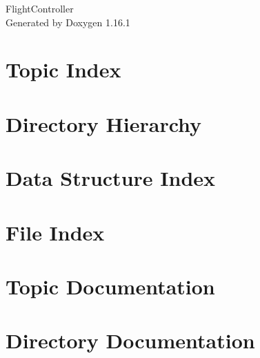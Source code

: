 \documentclass[twoside]{book}
\newcommand{\+}{\discretionary{\mbox{\scriptsize$\hookleftarrow$}}{}{}}
\newcommand{\clearemptydoublepage}{%
    \newpage{\pagestyle{empty}\cleardoublepage}%
  }
\begin{document}
  \raggedbottom
    \hypersetup{pageanchor=false,
                bookmarksnumbered=true,
                pdfencoding=unicode
               }
  \begin{titlepage}
  \vspace*{7cm}
  \begin{center}%
  {\Large Flight\+Controller}\\
  \vspace*{1cm}
  {\large Generated by Doxygen 1.16.1}\\
  \end{center}
  \end{titlepage}
  \clearemptydoublepage
  \tableofcontents
  \clearemptydoublepage
  \hypersetup{pageanchor=true}


\chapter{Topic Index}

\chapter{Directory Hierarchy}

\chapter{Data Structure Index}

\chapter{File Index}

\chapter{Topic Documentation}





\chapter{Directory Documentation}


\end{document}
